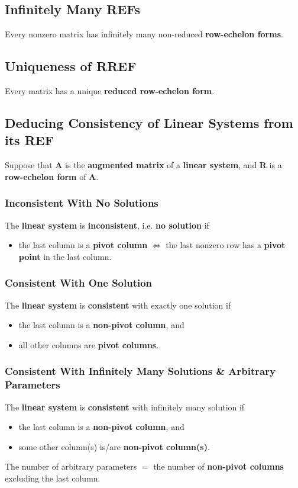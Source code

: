 \documentclass[../ma2001_notes.tex]{subfiles}
\begin{document}
\subsection{Infinitely Many REFs}
Every nonzero matrix has infinitely many non-reduced \textbf{row-echelon forms}.

\subsection{Uniqueness of RREF}
Every matrix has a unique \textbf{reduced row-echelon form}.

\subsection{Deducing Consistency of Linear Systems from its REF}
Suppose that \(\bm{A}\) is the \textbf{augmented matrix} of a \textbf{linear system}, and \(\bm{R}\) is a \textbf{row-echelon form} of \(\bm{A}\).

\subsubsection{Inconsistent With No Solutions}
The \textbf{linear system} is \textbf{inconsistent}, i.e. \textbf{no solution} if 
\begin{itemize}
	\item the last column is a \textbf{pivot column} \(\iff\) the last nonzero row has a \textbf{pivot point} in the last column.
\end{itemize}

\subsubsection{Consistent With One Solution}
The \textbf{linear system} is \textbf{consistent} with exactly one solution if 
\begin{itemize}
	\item the last column is a \textbf{non-pivot column}, and
	\item all other columns are \textbf{pivot columns}.
\end{itemize}

\subsubsection{Consistent With Infinitely Many Solutions \& Arbitrary Parameters}
The \textbf{linear system} is \textbf{consistent} with infinitely many solution if 
\begin{itemize}
	\item the last column is a \textbf{non-pivot column}, and
	\item some other column(s) is/are \textbf{non-pivot column(s)}.
\end{itemize}
The number of arbitrary parameters \(=\) the number of \textbf{non-pivot columns} excluding the last column.
\end{document}

